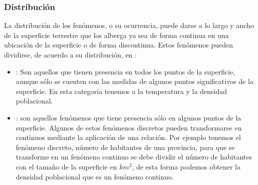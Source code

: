 \subsubsection{Distribución}
La distribución de los fenómenos, o su ocurrencia, puede darse a lo largo y ancho de la superficie
terrestre que los alberga ya sea de forma continua en una ubicación de la superficie o de forma
discontinua. Estos fenómenos pueden dividirse, de acuerdo a su distribución, en :

\begin{itemize}
    \item {} : Son aquellos que tienen presencia en todos los puntos de la superficie, aunque sólo se cuenten con las medidas de algunos puntos significativos de la superficie. En esta categoría tenemos a la temperatura y la densidad poblacional.

    \item {} : son aquellos fenómenos que tiene presencia sólo en algunos puntos de la superficie. Algunos de estos fenómenos discretos pueden transformarse en continuos mediante la aplicación de una relación. Por ejemplo tenemos el fenómeno discreto, número de habitantes de una provincia, para que se transforme en un fenómeno continuo se debe dividir el número de habitantes con el tamaño de la superficie en $km^2$, de esta forma podemos obtener la densidad poblacional que es un fenómeno continuo.
\end{itemize}
